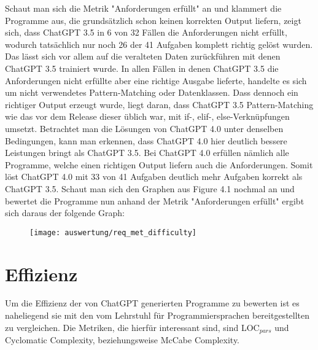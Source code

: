 \documentclass[class=scrbook, crop=false]{standalone}
\begin{document}
    Schaut man sich die Metrik "Anforderungen erfüllt" an und klammert die Programme aus, die grundsätzlich schon keinen korrekten Output liefern,
    zeigt sich, dass ChatGPT 3.5 in 6 von 32 Fällen die Anforderungen nicht erfüllt, wodurch tatsächlich nur noch 26 der 41 Aufgaben komplett richtig gelöst wurden.
    Das lässt sich vor allem auf die veralteten Daten zurückführen mit denen ChatGPT 3.5 trainiert wurde.
    In allen Fällen in denen ChatGPT 3.5 die Anforderungen nicht erfüllte aber eine richtige Ausgabe lieferte, handelte es sich um nicht
    verwendetes Pattern-Matching oder Datenklassen.
    Dass dennoch ein richtiger Output erzeugt wurde, liegt daran, dass ChatGPT 3.5 Pattern-Matching wie das vor dem
    Release dieser üblich war, mit if-, elif-, else-Verknüpfungen umsetzt.
    Betrachtet man die Lösungen von ChatGPT 4.0 unter denselben Bedingungen, kann man erkennen, dass ChatGPT 4.0 hier deutlich
    bessere Leistungen bringt als ChatGPT 3.5.
    Bei ChatGPT 4.0 erfüllen nämlich alle Programme, welche einen richtigen Output liefern auch die Anforderungen.
    Somit löst ChatGPT 4.0 mit 33 von 41 Aufgaben deutlich mehr Aufgaben korrekt als ChatGPT 3.5.
    Schaut man sich den Graphen aus Figure 4.1 nochmal an und bewertet die Programme nun anhand der Metrik "Anforderungen erfüllt" ergibt sich daraus der folgende Graph:
    \begin{figure}[H]
        \centering
        \texttt{[image: auswertung/req\_met\_difficulty]}
        \caption{}
        \label{fig:2}
    \end{figure}


\section{Effizienz}
\label{sec:effizienz}
    Um die Effizienz der von ChatGPT generierten Programme zu bewerten ist es naheliegend sie mit den vom Lehrstuhl für
    Programmiersprachen bereitgestellten zu vergleichen.
    Die Metriken, die hierfür interessant sind, sind LOC$_{pars}$ und Cyclomatic Complexity, beziehungsweise McCabe Complexity.
\end{document}
